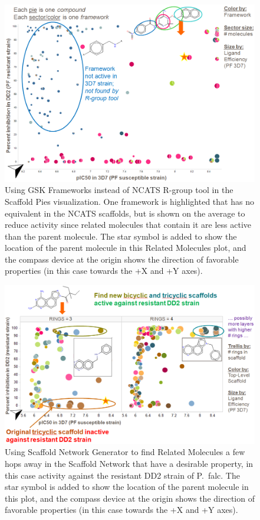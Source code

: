 \documentclass[journal=jacsat,manuscript=article]{achemso}
\begin{document}
\begin{figure}
\includegraphics[width=6in]{fig/mol1_frames_scafpie.png}
\caption{Using GSK Frameworks instead of NCATS R-group tool in the Scaffold Pies visualization. One framework is highlighted that has no equivalent in the NCATS scaffolds, but is shown on the average to reduce activity since related molecules that contain it are less active than the parent molecule.   The star symbol is added to show the location of the parent molecule in this Related Molecules plot, and the compass device at the origin shows the direction of favorable properties (in this case towards the +X and +Y axes).}      
\label{fig:frameswalk}
\end{figure}

\begin{figure}
\includegraphics[width=6in]{fig/mol2_SNG_relmol_trellis.png}
\caption{Using Scaffold Network Generator to find Related Molecules a few hops away in the Scaffold Network that have a desirable property, in this case activity against the resistant DD2 strain of P.~falc.  The star symbol is added to show the location of the parent molecule in this plot, and the compass device at the origin shows the direction of favorable properties (in this case towards the +X and +Y axes).}
\label{fig:SNGwalk}
\end{figure}
\end{document}
